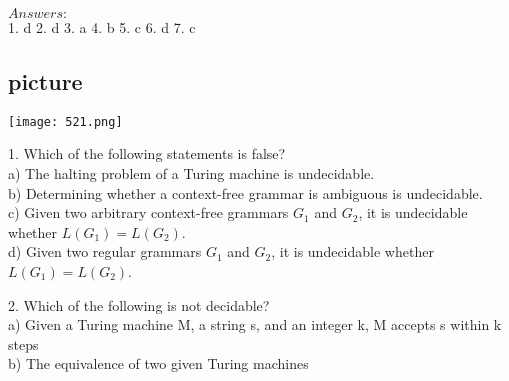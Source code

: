 \documentclass[8pt]{beamer}
\begin{document}
\begin{frame}
$Answers:$\\
1. d  \hspace*{0.5cm}  2. d   \hspace*{0.5cm}  3. a   \hspace*{0.5cm}  4. b   \hspace*{0.5cm}  5. c   \hspace*{0.5cm}  6. d   \hspace*{0.5cm}  7. c\\

\vspace*{0.3cm}
\begin{center}
\section{picture}
\texttt{[image: 521.png]}
\end{center}

\hspace*{-0.4cm}
1. Which of the following statements is false?\\

\vspace*{0.1cm}
\hspace*{0.5cm} a) The halting problem of a Turing machine is undecidable.\\

\vspace*{0.1cm}
\hspace*{0.5cm} b) Determining whether a context-free grammar is ambiguous is undecidable.\\

\vspace*{0.1cm}
\hspace*{0.5cm} c) Given two arbitrary context-free grammars $G _{1}$ and $G _{2}$, it is undecidable whether $L(G _{1}) =
L(G _{2})$.\\

\vspace*{0.1cm}
\hspace*{0.5cm} d) Given two regular grammars $G _{1}$ and $G _{2}$, it is undecidable whether $L(G _{1}) = L(G _{2})$.\\

\vspace*{0.2cm}

\hspace*{-0.4cm}
2. Which of the following is not decidable?\\

\vspace*{0.1cm}
\hspace*{0.5cm} a) Given a Turing machine M, a string s, and an integer k, M accepts s within k steps\\

\vspace*{0.1cm}
\hspace*{0.5cm} b) The equivalence of two given Turing machines\\

\vspace*{0.1cm}
\end{frame}
\end{document}
